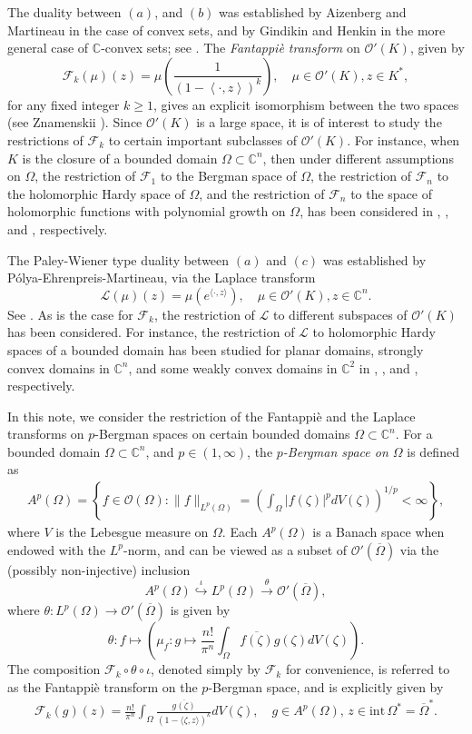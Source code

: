 \documentclass[11pt, oneside, reqno]{amsart}
\numberwithin{equation}{section}
\theoremstyle{definition}
\newcommand{\bes} {\begin{equation*}}
\newcommand{\ees} {\end{equation*}}
\newcommand{\be} {\begin{equation}}
\newcommand{\ee} {\end{equation}}
\newcommand{\bea} {\begin{eqnarray}}
\newcommand{\eea} {\end{eqnarray}}
\newcommand{\hol}{\mathcal {O}}
\newcommand{\C}{\mathbb C}
\newcommand{\Cn}{{\mathbb{C}^n}}
\newcommand{\F}{\mathcal F}
\newcommand{\ltt}{\left(}
\newcommand{\rtt}{\right)}
\newcommand{\Om}{\Omega}
\begin{document}
The duality between $(a)$, and $(b)$ was established by Aizenberg and Martineau in the case of convex sets, and by Gindikin and Henkin in the more general case of $\C$-convex sets; see \cite{Ab66,MA67,GsHg78}. The  {\em Fantappi{\`e} transform} on $\hol'(K)$, given by
\bes
\mathcal{F}_k\ltt\mu\rtt(z)=\mu\ltt\frac{1}{\ltt1-\left\langle\cdot,z\right\rangle\rtt^k}\rtt,\quad \mu\in\hol'(K), z\in K^*,
\ees
for any fixed integer $k\geq 1$,  gives an explicit isomorphism between the two spaces (see Znamenskii \cite{Zs85}). Since $\hol'\ltt K\rtt$ is a large space, it is of interest to study the restrictions of $\mathcal F_k$ to certain important subclasses of $\hol'\ltt K\rtt$. For instance, when $K$ is the closure of a bounded domain $\Om\subset\Cn$, then under different assumptions on $\Om$, the restriction of $\mathcal F_{1}$ to the Bergman space of $\Om$, the restriction of $\F_n$ to the holomorphic Hardy space of $\Om$, and the restriction of $\F_n$ to the space of holomorphic functions with polynomial growth on $\Om$, has been considered in \cite{MP05}, \cite{Li02}, and \cite{AaKl13}, respectively. 

The Paley-Wiener type duality between $(a)$ and $(c)$ was established by P{\'o}lya-Ehrenpreis-Martineau, via the Laplace transform 
\[
\mathcal{L}(\mu)(z)=\mu\ltt e^{\langle\cdot,z\rangle}\rtt,\quad \mu\in\hol'(K), z\in \C^n.
\] See \cite[Theorem 4.1.9]{APS}. As is the case for $\F_k$, the restriction of $\mathcal L$ to different subspaces of $\hol'(K)$ has been considered. For instance, the restriction of $\mathcal L$ to holomorphic Hardy spaces of a bounded domain has been studied for planar domains, strongly convex domains in $\C^n$, and some weakly convex domains in $\C^2$ in \cite{LuYl91}, \cite{Li02}, and \cite{AC24}, respectively. 

In this note, we consider the restriction of the Fantappi{\`e} and the Laplace transforms on $p$-Bergman spaces on certain bounded domains $\Om\subset\C^n$.
For a bounded domain $\Om\subset\C^n$, and $p\in(1,\infty)$, the {\em $p$-Bergman space on $\Om$} is defined as 
\bea\label{eq:def berg}
A^p\ltt\Om\rtt=\left\{f\in \hol\ltt\Om\rtt:\|f\|_{L^p(\Om)}=\ltt\int_\Om\left|f(\zeta)\right|^p dV(\zeta)\rtt^{1/p}<\infty\right\},
\eea
where $V$ is the Lebesgue measure on $\Om$. Each $A^p(\Om)$ is a Banach space when endowed with the $L^p$-norm, and can be viewed as a subset of $\hol'\ltt\overline\Om\rtt$ via the (possibly non-injective) inclusion
\be\label{eq:inclusion}
    A^p(\Om)\overset{\iota}{\hookrightarrow} L^p(\Om)\xrightarrow{\theta} \hol'\ltt\overline\Om\rtt,
\ee
where $\theta:L^p(\Om)\rightarrow\hol'\ltt\overline\Om\rtt$ is given by
\be\label{eq: theta}
\theta:f\mapsto \left(\mu_f:g\mapsto\frac{n!}{\pi^n}\int_\Om \overline{f(\zeta)} g(\zeta) dV(\zeta)\right).
\ee
The composition $\mathcal F_k\circ\theta\circ\iota$, denoted simply by $\mathcal F
_k$ for convenience, is referred to as the Fantappi{\`e} transform on the $p$-Bergman space, and is explicitly given by
\bea\label{eq:Fan berg}
\mathcal{F}_{k}(g)(z)=\frac{n!}{\pi^n}\int_{\Om} \frac{\overline{ g(\zeta)}}{\ltt 1-\langle \zeta,z\rangle\rtt^{k}}dV(\zeta),\quad g\in A^p(\Om),\, z\in \text{int}\,\Om^*=\overline\Om^*.
\eea
\end{document}
